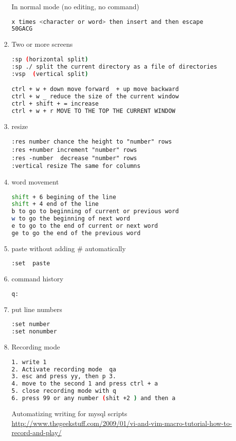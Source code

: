 \documentclass{article}
\begin{document}
\begin{enumerate}
In normal mode (no editing, no command) 
\begin{lstlisting}[language=bash]
x times <character or word> then insert and then escape 
50GACG

\end{lstlisting}
\item  Two or more  screens
\begin{lstlisting}[language=bash]
:sp (horizontal split) 
:sp ./ split the current directory as a file of directories
:vsp  (vertical split)

ctrl + w + down move forward  + up move backward
ctrl + w _ reduce the size of the current window
ctrl + shift + = increase
ctrl + w + r MOVE TO THE TOP THE CURRENT WINDOW
\end{lstlisting}

\item resize 
\begin{lstlisting}
:res number chance the height to "number" rows
:res +number increment "number" rows
:res -number  decrease "number" rows
:vertical resize The same for columns

\end{lstlisting}

\item word movement
\begin{lstlisting}[language=bash]
shift + 6 begining of the line
shift + 4 end of the line
b to go to beginning of current or previous word
w to go the beginning of next word
e to go to the end of current or next word
ge to go the end of the previous word
\end{lstlisting}
\item  paste without adding \# automatically
\begin{lstlisting}[language=bash]
:set  paste
\end{lstlisting}
\item  command history
\begin{lstlisting}[language=bash]
q:
\end{lstlisting}
\item  put line numbers
\begin{lstlisting}[language=bash]
:set number
:set nonumber
\end{lstlisting}
\item  Recording mode
\begin{lstlisting}[language=bash]
1. write 1
2. Activate recording mode  qa
3. esc and press yy, then p 3.
4. move to the second 1 and press ctrl + a
5. close recording mode with q
6. press 99 or any number (shit +2 ) and then a
\end{lstlisting}
Automatizing writing for mysql scripts \url{http://www.thegeekstuff.com/2009/01/vi-and-vim-macro-tutorial-how-to-record-and-play/}


\end{enumerate}
\end{document}
